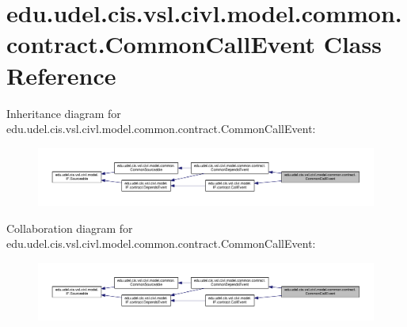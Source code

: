 \hypertarget{classedu_1_1udel_1_1cis_1_1vsl_1_1civl_1_1model_1_1common_1_1contract_1_1CommonCallEvent}{}\section{edu.\+udel.\+cis.\+vsl.\+civl.\+model.\+common.\+contract.\+Common\+Call\+Event Class Reference}
\label{classedu_1_1udel_1_1cis_1_1vsl_1_1civl_1_1model_1_1common_1_1contract_1_1CommonCallEvent}


Inheritance diagram for edu.\+udel.\+cis.\+vsl.\+civl.\+model.\+common.\+contract.\+Common\+Call\+Event\+:
\nopagebreak
\begin{figure}[H]
\begin{center}
\leavevmode
\includegraphics[width=350pt]{classedu_1_1udel_1_1cis_1_1vsl_1_1civl_1_1model_1_1common_1_1contract_1_1CommonCallEvent__inherit__graph}
\end{center}
\end{figure}


Collaboration diagram for edu.\+udel.\+cis.\+vsl.\+civl.\+model.\+common.\+contract.\+Common\+Call\+Event\+:
\nopagebreak
\begin{figure}[H]
\begin{center}
\leavevmode
\includegraphics[width=350pt]{classedu_1_1udel_1_1cis_1_1vsl_1_1civl_1_1model_1_1common_1_1contract_1_1CommonCallEvent__coll__graph}
\end{center}
\end{figure}
